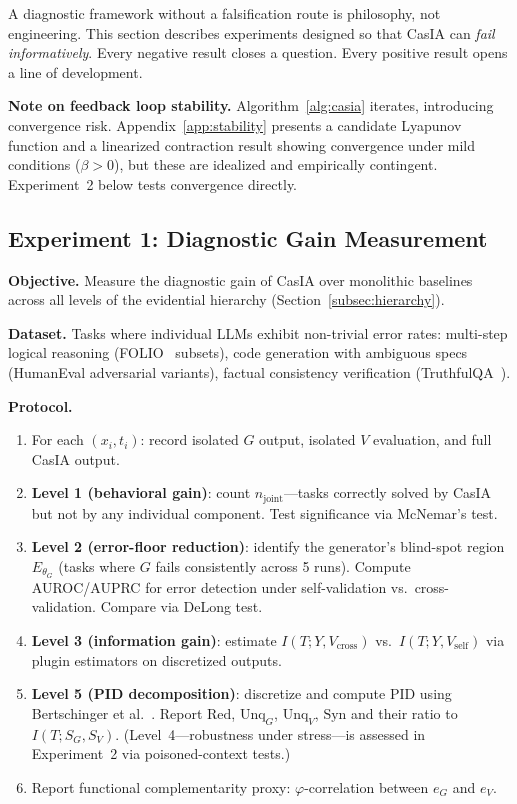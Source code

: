 \documentclass[11pt,a4paper]{article}
\theoremstyle{definition}
\newcommand{\thetaG}{\theta_G}
\begin{document}
A diagnostic framework without a falsification route is philosophy, not engineering. This section describes experiments designed so that CasIA can \emph{fail informatively}. Every negative result closes a question. Every positive result opens a line of development.

\textbf{Note on feedback loop stability.} Algorithm~\ref{alg:casia} iterates, introducing convergence risk. Appendix~\ref{app:stability} presents a candidate Lyapunov function and a linearized contraction result showing convergence under mild conditions ($\beta > 0$), but these are idealized and empirically contingent. Experiment~2 below tests convergence directly.

\subsection{Experiment 1: Diagnostic Gain Measurement}

\textbf{Objective.} Measure the diagnostic gain of CasIA over monolithic baselines across all levels of the evidential hierarchy (Section~\ref{subsec:hierarchy}).

\textbf{Dataset.} Tasks where individual LLMs exhibit non-trivial error rates: multi-step logical reasoning (FOLIO~\cite{han2022folio} subsets), code generation with ambiguous specs (HumanEval adversarial variants), factual consistency verification (TruthfulQA~\cite{lin2022truthfulqa}).

\textbf{Protocol.}
\begin{enumerate}[leftmargin=*,itemsep=2pt]
\item For each $(x_i, t_i)$: record isolated $G$ output, isolated $V$ evaluation, and full CasIA output.
\item \textbf{Level 1 (behavioral gain)}: count $n_\text{joint}$---tasks correctly solved by CasIA but not by any individual component. Test significance via McNemar's test.
\item \textbf{Level 2 (error-floor reduction)}: identify the generator's blind-spot region $E_{\thetaG}$ (tasks where $G$ fails consistently across 5 runs). Compute AUROC/AUPRC for error detection under self-validation vs.\ cross-validation. Compare via DeLong test.
\item \textbf{Level 3 (information gain)}: estimate $I(T; Y, V_\text{cross})$ vs.\ $I(T; Y, V_\text{self})$ via plugin estimators on discretized outputs.
\item \textbf{Level 5 (PID decomposition)}: discretize and compute PID using Bertschinger et al.~\cite{bertschinger2014pid}. Report $\mathrm{Red}$, $\mathrm{Unq}_G$, $\mathrm{Unq}_V$, $\mathrm{Syn}$ and their ratio to $I(T; S_G, S_V)$. (Level~4---robustness under stress---is assessed in Experiment~2 via poisoned-context tests.)
\item Report functional complementarity proxy: $\varphi$-correlation between $e_G$ and $e_V$.
\end{enumerate}
\end{document}
